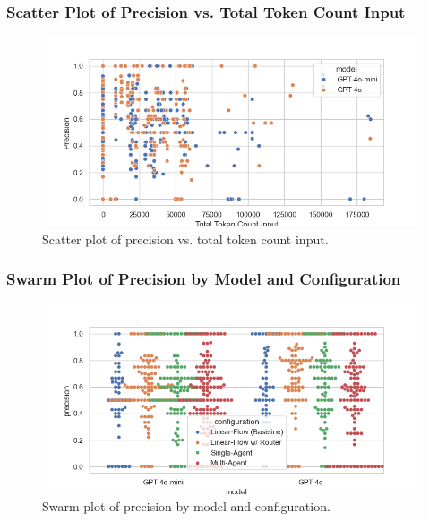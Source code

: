             \subsubsection{Scatter Plot of Precision vs. Total Token Count Input}
            \begin{figure}[H]
                \centering
                \includegraphics[scale=0.75]{images_exp2/precision/scatter_precision_vs_total_token_count_input.png}
                \caption{Scatter plot of precision vs. total token count input.}
                \label{fig:scatter_precision_vs_total_token_count_input}
            \end{figure}

            \subsubsection{Swarm Plot of Precision by Model and Configuration}
            \begin{figure}[H]
                \centering
                \includegraphics[scale=0.75]{images_exp2/precision/swarm_precision_by_model_and_configuration.png}
                \caption{Swarm plot of precision by model and configuration.}
                \label{fig:swarm_precision_by_model_and_configuration}
            \end{figure}

